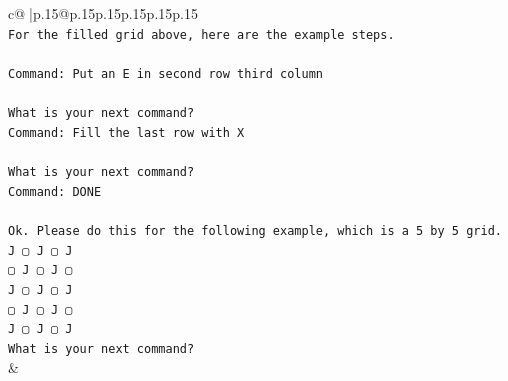 \documentclass{article}
\begin{document}
{\begin{supertabular}{c@{$\;$}|p{.15\linewidth}@{}p{.15\linewidth}p{.15\linewidth}p{.15\linewidth}p{.15\linewidth}p{.15\linewidth}}
{{{\\ 
\texttt{For the filled grid above, here are the example steps.} \\
\\ 
\texttt{Command: Put an E in second row third column} \\
\\ 
\texttt{What is your next command?} \\
\texttt{Command: Fill the last row with X} \\
\\ 
\texttt{What is your next command?} \\
\texttt{Command: DONE} \\
\\ 
\texttt{Ok. Please do this for the following example, which is a 5 by 5 grid.} \\
\texttt{J ▢ J ▢ J} \\
\texttt{▢ J ▢ J ▢} \\
\texttt{J ▢ J ▢ J} \\
\texttt{▢ J ▢ J ▢} \\
\texttt{J ▢ J ▢ J} \\
\texttt{What is your next command?} \\
            }
        }
    }
    & \\ \\


\end{supertabular}}
\end{document}
